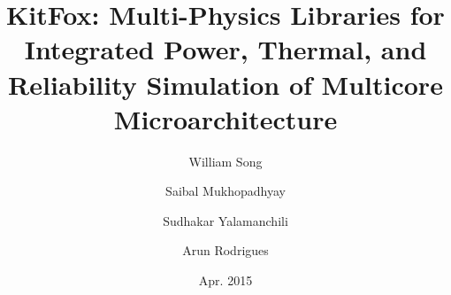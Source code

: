 \documentclass[10pt]{article}
\begin{document}
\title{\vspace*{80pt}\leavevmode 
\fontsize{20pt}{24pt}\selectfont \textbf{KitFox: Multi-Physics Libraries for Integrated Power, Thermal, and Reliability Simulation of Multicore Microarchitecture}
\vspace*{20pt}\leavevmode}

\author[$\dagger$]{William Song}
\author[$\dagger$]{Saibal Mukhopadhyay}
\author[$\dagger$]{Sudhakar Yalamanchili}
\author[$\ddagger$]{Arun Rodrigues}

\date{\vspace*{20pt}\leavevmode Apr. 2015}
\maketitle
\pagebreak
\tableofcontents
\pagebreak


\pagebreak

\pagebreak

\pagebreak

\pagebreak

\pagebreak

\pagebreak

\pagebreak

\pagebreak

\pagebreak

\pagebreak

\pagebreak

\end{document}
